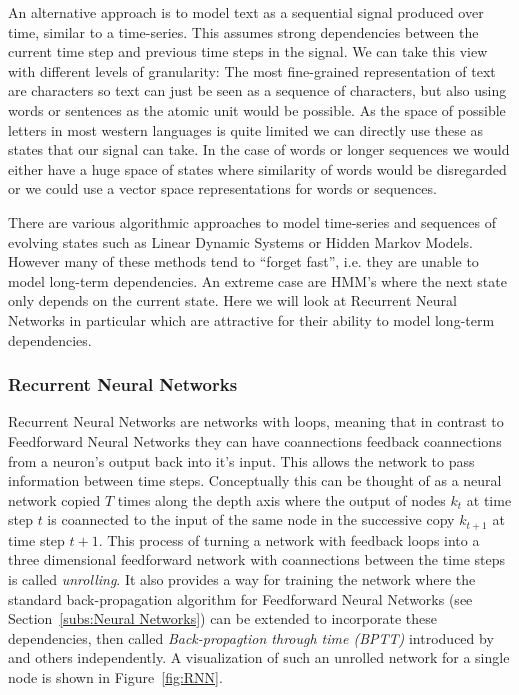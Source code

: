 An alternative approach is to model text as a sequential signal produced over time, similar to a time-series. This assumes strong dependencies between the current time step and previous time steps in the signal.
We can take this view with different levels of granularity: The most fine-grained representation of text are characters so text can just be seen as a sequence of characters, but also using words or sentences as the atomic unit would be possible. As the space of possible letters in most western languages is quite limited we can directly use these as states that our signal can take. In the case of words or longer sequences we would either have a huge space of states where similarity of words would be disregarded or we could use a vector space representations for words or sequences.

There are various algorithmic approaches to model time-series and sequences of evolving states such as Linear Dynamic Systems or Hidden Markov Models. However many of these methods tend to ``forget fast'', i.e. they are unable to model long-term dependencies. An extreme case are HMM's where the next state only depends on the current state. Here we will look at Recurrent Neural Networks in particular which are attractive for their ability to model long-term dependencies.

\subsubsection*{Recurrent Neural Networks}
\label{subs:Recurrent Neural Networks}

Recurrent Neural Networks are networks with loops, meaning that in contrast to Feedforward Neural Networks they can have coannections feedback coannections from a neuron's output back into it's input. This allows the network to pass information between time steps. Conceptually this can be thought of as a neural network copied $T$ times along the depth axis where the output of nodes $k_t$ at time step $t$ is coannected to the input of the same node in the successive copy $k_{t+1}$ at time step $t+1$. This process of turning a network with feedback loops into a three dimensional feedforward network with coannections between the time steps is called \emph{unrolling}.
It also provides a way for training the network where the standard back-propagation algorithm for Feedforward Neural Networks (see Section~\ref{subs:Neural Networks}) can be extended to incorporate these dependencies, then called \emph{Back-propagtion through time (BPTT)} introduced by~\cite{Werbos:1988aa} and others independently. A visualization of such an unrolled network for a single node is shown in Figure~\ref{fig:RNN}.

